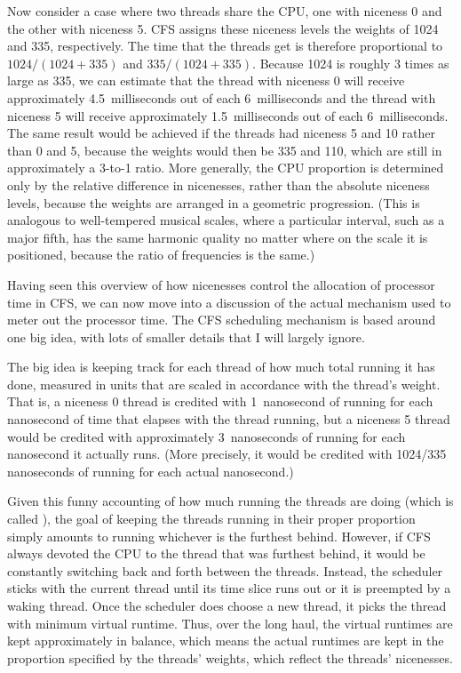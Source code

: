 Now consider a case where two threads share the CPU, one with
niceness 0 and the other with niceness 5.  CFS assigns these niceness
levels the weights of 1024 and 335, respectively.  The time that the
threads get is therefore proportional to $1024/(1024+335)$ and
$335/(1024+335)$.  Because 1024 is roughly 3 times as large as 335, we
can estimate that the thread with niceness 0 will receive
approximately 4.5~milliseconds out of each 6~milliseconds and
the thread with niceness 5 will receive approximately 1.5~milliseconds out of each
6~milliseconds.  The same result would be achieved if
the threads had niceness 5 and 10 rather than 0 and 5, because the
weights would then be 335 and 110, which are still in approximately a
3-to-1 ratio.  More generally, the CPU proportion is determined only
by the relative difference in nicenesses, rather than the absolute
niceness levels, because the weights are arranged in a geometric
progression.  (This is analogous to well-tempered musical scales, where a particular
interval, such as a major fifth, has the same harmonic quality no
matter where on the scale it is positioned, because the ratio of
frequencies is the same.)

Having seen this overview of how nicenesses control the allocation of
processor time in CFS, we can now move into a discussion of the actual
mechanism used to meter out the processor time.
The CFS scheduling mechanism is based around one big idea, with
lots of smaller details that I will largely ignore.

The big idea is
keeping track for each thread of how much total running it has done,
measured in units that are scaled in accordance with the thread's
weight.  That is, a niceness 0 thread is credited with 1~nanosecond of running
for each nanosecond of time that elapses with the thread running, but
a niceness 5 thread would be credited with approximately 3~nanoseconds of
running for each nanosecond it actually runs.  (More precisely, it
would be credited with 1024/335 nanoseconds of running for each
actual nanosecond.)

Given this funny accounting of how much running
the threads are doing (which is called ), the goal of keeping the threads running in
their proper proportion simply amounts to running whichever is the
furthest behind.  However, if CFS always devoted the CPU to the thread that was furthest behind,
it would be constantly switching back and forth between the threads.
Instead, the scheduler sticks with the current thread until its
time slice runs out or it is preempted by a waking thread.
Once the scheduler does choose a new thread, it picks the thread
with minimum virtual runtime.  Thus, over the long haul, the virtual
runtimes are kept approximately in balance, which means the actual
runtimes are kept in the proportion specified by the threads'
weights, which reflect the threads'
nicenesses.

